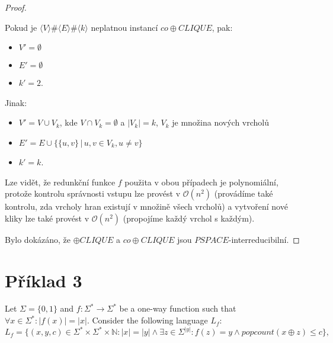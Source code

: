 \documentclass[a4paper, 11pt, fleqn]{scrartcl}
\begin{document}
\begin{proof}
\begin{adjustwidth}{1em}{0em}
          Pokud je $\langle V \rangle \# \langle E \rangle \# \langle k \rangle$ neplatnou instancí $\mathit{co}\oplus\mathit{CLIQUE}$, pak:
          \begin{itemize}
            \item $V' = \emptyset$
            \item $E' = \emptyset$
            \item $k' = 2$.
          \end{itemize}

          Jinak:
          \begin{itemize}
            \item $V' = V \cup V_k$, kde $V \cap V_k = \emptyset$ a $|V_k| = k$, $V_k$ je množina nových vrcholů
            \item $E' = E \cup \{\{u, v\}\,|\, u, v \in V_k, u \neq v\}$
            \item $k' = k$.
          \end{itemize}
        \end{adjustwidth}

        \vspace{0.5cm}

        Lze vidět, že redunkční funkce $f$ použita v obou případech je polynomiální, protože kontrolu správnosti vstupu lze provést v $\mathcal{O}(n^2)$ (provádíme také kontrolu, zda vrcholy hran existují v množině všech vrcholů) a vytvoření nové kliky lze také provést v $\mathcal{O}(n^2)$ (propojíme každý vrchol s každým).

        \vspace{0.5cm}

        Bylo dokázáno, že $\oplus\mathit{CLIQUE}$ a $\mathit{co}\oplus\mathit{CLIQUE}$ jsou \footnotesize$\mathit{PSPACE}$\normalsize-interreducibilní.
    \end{proof}


  \section*{Příklad 3}
    Let $\Sigma = \{0, 1\}$ and $f : \Sigma^* \rightarrow \Sigma^*$ be a one-way function such that $\forall x \in \Sigma^* : |f(x)| = |x|$. Consider the following language $L_f$:
    $$L_f = \{(x, y, c) \in \Sigma^* \times \Sigma^* \times \mathbb{N} : |x| = |y| \land \exists z \in \Sigma^{|y|} : f(z) = y \land \mathit{popcount}(x \oplus z) \leq c\},$$
\end{document}
